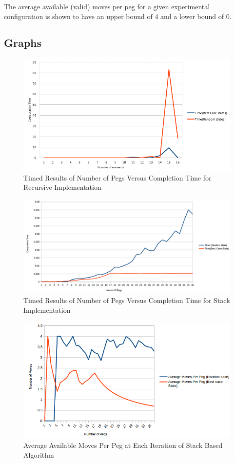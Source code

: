 \documentclass[a4paper]{article}
\begin{document}
\noindent The average available (valid) moves per peg for a given experimental configuration is shown to have an upper bound of 4 and a lower bound of 0.

\subsection{Graphs}
\begin{figure}[H]
	\centering
	\label{recursive}
	\includegraphics[width=.90\textwidth,scale=.90]{images/Recursive}
	\caption{Timed Results of Number of Pegs Versus Completion Time for Recursive Implementation}
\end{figure}

\begin{figure}[H]
	\centering
	\label{avgnumpegs}
	\includegraphics[width=.90\textwidth,scale=.90]{images/Stack}
	\caption{Timed Results of Number of Pegs Versus Completion Time for Stack Implementation}
\end{figure}

\begin{figure}[H]
	\centering
	\label{avgnumpegs}
	\includegraphics[width=.90\textwidth,scale=.90]{images/AverageNumPegs}
	\caption{Average Available Moves Per Peg at Each Iteration of Stack Based Algorithm}
\end{figure}
\end{document}
